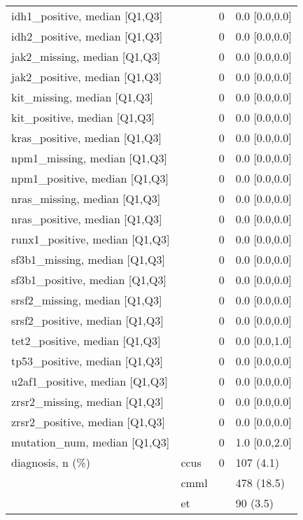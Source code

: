 \begin{tabular}{llll}
idh1\_positive, median [Q1,Q3] &    &      0 &     0.0 [0.0,0.0] \\
idh2\_positive, median [Q1,Q3] &    &      0 &     0.0 [0.0,0.0] \\
jak2\_missing, median [Q1,Q3] &    &      0 &     0.0 [0.0,0.0] \\
jak2\_positive, median [Q1,Q3] &    &      0 &     0.0 [0.0,0.0] \\
kit\_missing, median [Q1,Q3] &    &      0 &     0.0 [0.0,0.0] \\
kit\_positive, median [Q1,Q3] &    &      0 &     0.0 [0.0,0.0] \\
kras\_positive, median [Q1,Q3] &    &      0 &     0.0 [0.0,0.0] \\
npm1\_missing, median [Q1,Q3] &    &      0 &     0.0 [0.0,0.0] \\
npm1\_positive, median [Q1,Q3] &    &      0 &     0.0 [0.0,0.0] \\
nras\_missing, median [Q1,Q3] &    &      0 &     0.0 [0.0,0.0] \\
nras\_positive, median [Q1,Q3] &    &      0 &     0.0 [0.0,0.0] \\
runx1\_positive, median [Q1,Q3] &    &      0 &     0.0 [0.0,0.0] \\
sf3b1\_missing, median [Q1,Q3] &    &      0 &     0.0 [0.0,0.0] \\
sf3b1\_positive, median [Q1,Q3] &    &      0 &     0.0 [0.0,0.0] \\
srsf2\_missing, median [Q1,Q3] &    &      0 &     0.0 [0.0,0.0] \\
srsf2\_positive, median [Q1,Q3] &    &      0 &     0.0 [0.0,0.0] \\
tet2\_positive, median [Q1,Q3] &    &      0 &     0.0 [0.0,1.0] \\
tp53\_positive, median [Q1,Q3] &    &      0 &     0.0 [0.0,0.0] \\
u2af1\_positive, median [Q1,Q3] &    &      0 &     0.0 [0.0,0.0] \\
zrsr2\_missing, median [Q1,Q3] &    &      0 &     0.0 [0.0,0.0] \\
zrsr2\_positive, median [Q1,Q3] &    &      0 &     0.0 [0.0,0.0] \\
mutation\_num, median [Q1,Q3] &    &      0 &     1.0 [0.0,2.0] \\
diagnosis, n (\%) & ccus &      0 &         107 (4.1) \\
                 & cmml &        &        478 (18.5) \\
                 & et &        &          90 (3.5) \\

\end{tabular}
